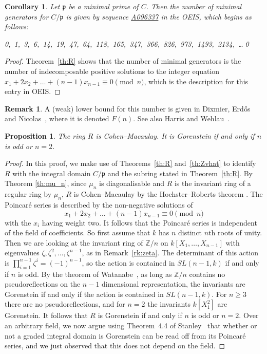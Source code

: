 \documentclass[12pt]{amsart}
\renewcommand{\ge}{\geqslant}
\newcommand{\bZ}{{\mathbb{Z}}}
\newcommand{\mfp}{\mathfrak{p}}
\numberwithin{equation}{section}
\newtheorem{corollary}[equation]{Corollary}
\newtheorem{proposition}[equation]{Proposition}
\theoremstyle{definition}
\newtheorem{remark}[equation]{Remark}
\begin{document}
\begin{corollary}\label{co:oeis}
Let $\mfp$ be a minimal prime of $C$. Then 
the number of minimal generators for $C/\mfp$ is given by sequence 
\href{http://oeis.org/A096337}{\rm A096337} in
the {\rm OEIS}, which begins as follows:
\begin{center} 
\hfill\rm 0,\ 1,\ 3,\ 6,\ 14,\ 19,\ 47,\ 64,\ 118,\ 165,\ 347,\ 366,\ 826,\
  973,\ 1493,\ 2134,\ \dots \hfill \qed
\end{center}
\end{corollary}
\begin{proof}
Theorem~\ref{th:R} shows that the number of minimal generators is the number
of indecomposable positive solutions to the integer equation 
$x_1+2x_2+\dots+(n-1)x_{n-1}\equiv 0 \pmod n$, which is the
description for this entry in OEIS.
\end{proof}

\begin{remark}
A (weak) lower bound for this number is
given in Dixmier, Erd\H{o}s and
Nicolas~\cite{Dixmier/Erdos/Nicolas:1987a}, where it is denoted $F(n)$.  See also Harris and 
Wehlau~\cite{Harris/Wehlau:2006a}. 
\end{remark}

\begin{proposition}
The ring $R$ is Cohen--Macaulay. It is Gorenstein if and
only if $n$ is odd or $n=2$.
\end{proposition}
\begin{proof}
In this proof, we make use of Theorems~\ref{th:R} and~\ref{th:Zvhat} to
identify $R$ with the integral domain $C/\mathfrak{p}$ and the
subring stated in Theorem~\ref{th:R}. By Theorem \ref{th:mu_n}, since $\mu_n$ is diagonalisable and $R$ is the invariant ring of a regular ring by $\mu_n$, $R$ is Cohen--Macaulay by the Hochster--Roberts theorem \cite{Hochster/Roberts:1974a}.
The Poincar\'e series is described by the non-negative solutions of
\[ x_1+2x_2+\dots+(n-1)x_{n-1}\equiv 0 \pmod{n} \] 
with the $x_i$ having
weight two. It follows that the Poincar\'e series is 
independent of the field of coefficients. So first assume
that $k$ has $n$ distinct $n$th roots of unity. Then we are looking at
the invariant ring of $\bZ/n$ on $k[X_1,\dots,X_{n-1}]$ with
eigenvalues $\zeta,\zeta^2,\dots,\zeta^{n-1}$, as in
Remark~\ref{rk:zeta}. The determinant of this action is 
$\prod_{i=1}^{n-1}\zeta^i=(-1)^{n-1}$, so
the action is contained in $SL(n-1,k)$ if and only if $n$ is odd. By
the theorem of Watanabe~\cite{Watanabe:1974a,Watanabe:1974b}, as long
as $\bZ/n$ contains no pseudoreflections on the $n-1$ dimensional
representation,  the
invariants are Gorenstein if and only if the action is contained in
$SL(n-1,k)$. For $n\ge 3$ there are no pseudoreflections, and for
$n=2$ the invariants $k[X_1^2]$ are Gorenstein. It follows that $R$ is
Gorenstein if and only if $n$ is odd or $n=2$. Over an arbitrary field, we now argue using Theorem~4.4
of Stanley~\cite{Stanley:1978a} that whether or not a graded integral domain is
Gorenstein can be read off from its Poincar\'e series, and we just
observed that this does not depend on the field.
\end{proof}
\end{document}
